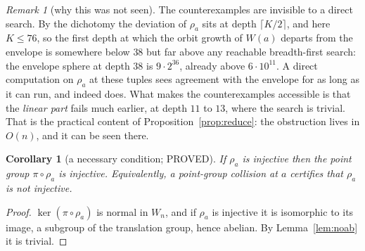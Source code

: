 \documentclass[11pt]{article}
\newtheorem{corollary}[theorem]{Corollary}
\theoremstyle{definition}
\theoremstyle{remark}
\newtheorem{remark}[theorem]{Remark}
\theoremstyle{definition}
\begin{document}
\begin{remark}[why this was not seen]\label{rem:whynotseen}
The counterexamples are invisible to a direct search. By the dichotomy the deviation of $\rho_a$
sits at depth $\lceil K/2\rceil$, and here $K\le76$, so the first depth at which the orbit growth
of $W(a)$ departs from the envelope is somewhere below $38$ but far above any reachable
breadth-first search: the envelope sphere at depth $38$ is $9\cdot2^{36}$, already above
$6\cdot10^{11}$. A direct
computation on $\rho_a$ at these tuples sees agreement with the envelope for as long as it can
run, and indeed does. What makes the counterexamples accessible is that the \emph{linear part}
fails much earlier, at depth $11$ to $13$, where the search is trivial. That is the practical
content of Proposition~\ref{prop:reduce}: the obstruction lives in $O(n)$, and it can be seen
there.
\end{remark}

\begin{corollary}[a necessary condition; PROVED]\label{cor:necessary}
If $\rho_a$ is injective then the point group $\pi\circ\rho_a$ is injective. Equivalently, a
point-group collision at $a$ certifies that $\rho_a$ is not injective.
\end{corollary}

\begin{proof}
$\ker(\pi\circ\rho_a)$ is normal in $W_n$, and if $\rho_a$ is injective it is isomorphic to its
image, a subgroup of the translation group, hence abelian. By Lemma~\ref{lem:noab} it is trivial.
\end{proof}
\end{document}
